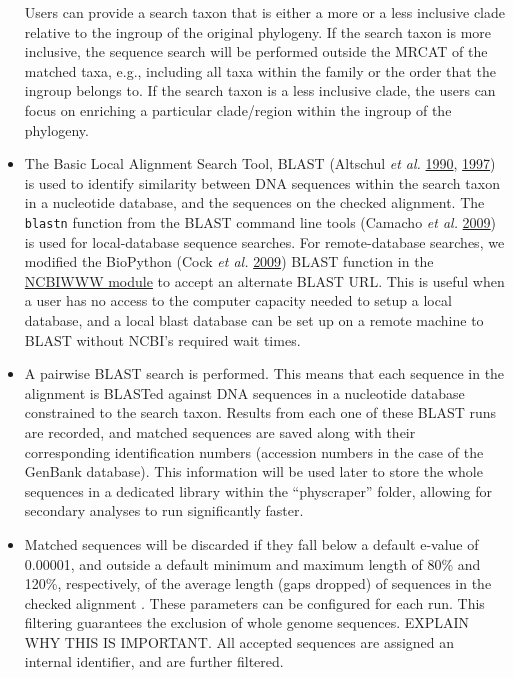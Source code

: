\documentclass[]{article}
\begin{document}
\begin{itemize}
  Users can provide a search taxon that is either a more or a less inclusive
  clade relative to the ingroup of the original phylogeny. If the search taxon is more inclusive, the sequence search will be performed outside the MRCAT of the matched taxa, e.g., including all taxa within
  the family or the order that the ingroup belongs to. If the search taxon is a less inclusive clade, the users can focus on enriching a particular clade/region within the ingroup of the phylogeny.
\item
  The Basic Local Alignment Search Tool, BLAST (Altschul \emph{et al.} \protect\hyperlink{ref-altschul1990basic}{1990}, \protect\hyperlink{ref-altschul1997gapped}{1997}) is used to identify
  similarity between DNA sequences within the search taxon in a nucleotide
  database, and the sequences on the checked alignment.
  The \texttt{blastn} function from the BLAST command line tools (Camacho \emph{et al.} \protect\hyperlink{ref-camacho2009blast}{2009}) is used for local-database sequence searches.
  For remote-database searches, we modified the BioPython (Cock \emph{et al.} \protect\hyperlink{ref-cock2009biopython}{2009}) BLAST function in the \href{https://biopython.org/DIST/docs/api/Bio.Blast.NCBIWWW-module.html}{NCBIWWW module} to accept an alternate BLAST URL. This is useful when a user has no access to the computer capacity needed to setup a local database, and a local blast database can be set up on a remote machine to BLAST without NCBI's required wait times.
\item
  A pairwise BLAST search is performed. This means that each sequence
  in the alignment is BLASTed against DNA sequences in a nucleotide database constrained to the search
  taxon. Results from each one of these BLAST runs are recorded, and matched sequences are saved
  along with their corresponding identification numbers (accession numbers in the case of the GenBank database). This information will be used later to store the whole sequences in a dedicated library within the ``physcraper'' folder, allowing for secondary analyses to run significantly faster.
\item
  Matched sequences will be discarded if they fall below a default e-value of 0.00001, and outside a default minimum and maximum length of 80\% and 120\%, respectively, of the average length (gaps dropped) of sequences in the checked alignment .
  These parameters can be configured for each run.
  This filtering guarantees the exclusion of whole genome sequences. EXPLAIN WHY THIS IS IMPORTANT.
  All accepted sequences are assigned an internal identifier, and are further filtered.

\end{itemize}
\end{document}
